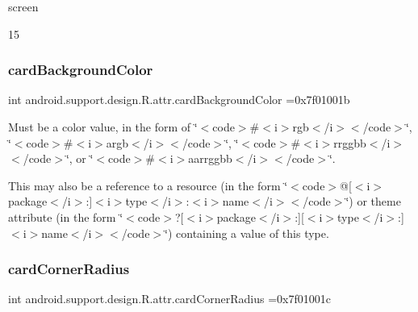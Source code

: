 {\ttfamily screen}

15\mbox{\label{classandroid_1_1support_1_1design_1_1R_1_1attr_a1328a32ea9c593fc1f8a1a0b6f19e84e}} 
\subsubsection{\texorpdfstring{card\+Background\+Color}{cardBackgroundColor}}
{\footnotesize\ttfamily int android.\+support.\+design.\+R.\+attr.\+card\+Background\+Color =0x7f01001b\hspace{0.3cm}{\ttfamily [static]}}

Must be a color value, in the form of \char`\"{}$<$code$>$\#$<$i$>$rgb$<$/i$>$$<$/code$>$\char`\"{}, \char`\"{}$<$code$>$\#$<$i$>$argb$<$/i$>$$<$/code$>$\char`\"{}, \char`\"{}$<$code$>$\#$<$i$>$rrggbb$<$/i$>$$<$/code$>$\char`\"{}, or \char`\"{}$<$code$>$\#$<$i$>$aarrggbb$<$/i$>$$<$/code$>$\char`\"{}. 

This may also be a reference to a resource (in the form \char`\"{}$<$code$>$@\mbox{[}$<$i$>$package$<$/i$>$\+:\mbox{]}$<$i$>$type$<$/i$>$\+:$<$i$>$name$<$/i$>$$<$/code$>$\char`\"{}) or theme attribute (in the form \char`\"{}$<$code$>$?\mbox{[}$<$i$>$package$<$/i$>$\+:\mbox{]}\mbox{[}$<$i$>$type$<$/i$>$\+:\mbox{]}$<$i$>$name$<$/i$>$$<$/code$>$\char`\"{}) containing a value of this type. \mbox{\label{classandroid_1_1support_1_1design_1_1R_1_1attr_a0892312691f51ddd1d073df8df17e82a}} 
\subsubsection{\texorpdfstring{card\+Corner\+Radius}{cardCornerRadius}}
{\footnotesize\ttfamily int android.\+support.\+design.\+R.\+attr.\+card\+Corner\+Radius =0x7f01001c\hspace{0.3cm}{\ttfamily [static]}}


